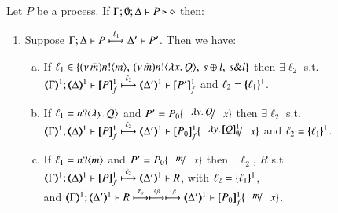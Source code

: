 \begin{proposition}
	\label{prop:lts_corr_HOp_to_HO}
	Let $P$ be a \HOp process.
	If $\Gamma; \emptyset; \Delta \vdash P \triangleright \diamond$ then:
%
	\begin{enumerate}[1.]
		\item
			Suppose $\Gamma; \Delta \vdash P \stackrel{\ell_1}{\longmapsto} \Delta' \vdash P'$. Then we have:
%
			\begin{enumerate}[a)]
				\item
					If $\ell_1 \in \{(\nu\, \tilde{m})n ! \langle m \rangle, \,(\nu\, \tilde{m})n ! \langle \lambda x.\,Q \rangle, \,s \oplus l, \,s \& l\}$
					then $\exists \ell_2$ s.t. \\
					$\horel{\tmap{\Gamma}{1}}{\tmap{\Delta}{1}}{\pmapp{P}{1}{f}}{\hby{\ell_2}}{\tmap{\Delta'}{1}}{\pmapp{P'}{1}{f}}$
					and $\ell_2 = \{\!\!\{\ell_1\}\!\!\}^{1}$.
			
				\item
					If $\ell_1 = n ? \langle \lambda y.\,Q \rangle$ and
					$P' = P_0 \subst{\abs{y}Q}{x}$
					then $\exists \ell_2$ s.t. \\
					$\horel{\tmap{\Gamma}{1}}{\tmap{\Delta}{1}}{\pmapp{P}{1}{f}}{\hby{\ell_2}}{\tmap{\Delta'}{1}}{\pmapp{P_0}{1}{f}\subst{\abs{y}\pmapp{Q}{1}{\emptyset}}{x}}$
					and $\ell_2 = \{\!\!\{\ell_1\}\!\!\}^{1}$.
			
				\item
					If $\ell_1 = n ? \langle m \rangle$
					and 
					$P' = P_0 \subst{m}{x}$
					then $\exists \ell_2$, $R$ s.t. \\
					$\horel{\tmap{\Gamma}{1}}{\tmap{\Delta}{1}}{\pmapp{P}{1}{f}}{\hby{\ell_2}}{\tmap{\Delta'}{1}}{R}$,
					with $\ell_2 = \{\!\!\{\ell_1\}\!\!\}^{1}$, \\
					and
					$\horel{\tmap{\Gamma}{1}}{\tmap{\Delta'}{1}}{R}{\hby{\stau} \hby{\btau} \hby{\btau}}
					{\tmap{\Delta'}{1}}{\pmapp{P_0}{1}{f}\subst{m}{x}}$.
						

\end{enumerate}
\end{enumerate}
\end{proposition}
